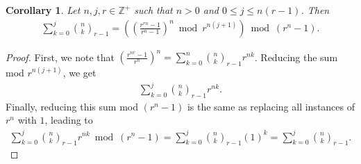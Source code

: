 \documentclass[10pt]{article}
\theoremstyle{plain}
\newtheorem{corollary}{Corollary}[section]
\begin{document}
\begin{corollary} \label{proof:multinomialcoeffpartialsums}
Let $n,j,r \in \mathbb{Z}^+$ such that $n > 0$ and $0 \leq j \leq n (r-1)$. Then
\begin{align*}
\sum_{k=0}^{j} \binom{n}{k}_{r-1}
= \left( \left( \frac{r^{rn}-1}{r^n-1} \right)^n \bmod r^{n(j+1)} \right) \bmod (r^n-1) .
\end{align*}
\end{corollary}
\begin{proof}
First, we note that $\left(\frac{r^{nr}-1}{r^n}\right)^n = \sum_{k=0}^n \binom{n}{k}_{r-1} r^{nk}$. Reducing the sum mod $r^{n(j+1)}$, we get
\begin{align*}
    \sum_{k=0}^{j} \binom{n}{k}_{r-1} r^{nk} .
\end{align*}
Finally, reducing this sum mod $(r^n-1)$ is the same as replacing all instances of $r^n$ with $1$, leading to
\begin{align*}
    \sum_{k=0}^{j} \binom{n}{k}_{r-1} r^{nk} \bmod (r^n-1)
    = \sum_{k=0}^{j} \binom{n}{k}_{r-1} (1)^{k}
    = \sum_{k=0}^{j} \binom{n}{k}_{r-1} .
\end{align*}
\end{proof}
\end{document}
